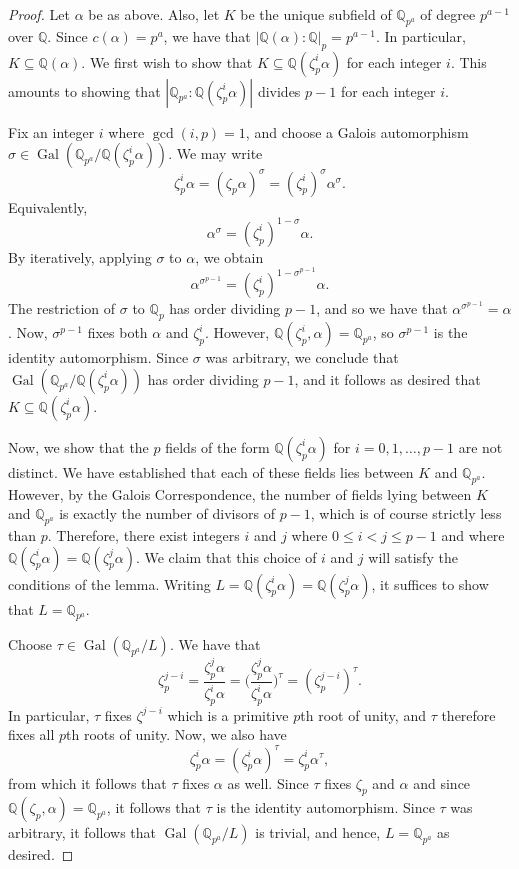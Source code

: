 \documentclass[12pt]{amsart}
\theoremstyle{definition}
\newcommand{\Q}{\mathbb{Q}}
\DeclareMathOperator{\Gal}{Gal}
\begin{document}
\begin{proof}
	Let $\alpha$ be as above. Also, let $K$ be the unique subfield of $\Q_{p^a}$ of degree $p^{a-1}$ over $\Q$. Since $c(\alpha) = p^{a}$, we have that $|\Q(\alpha) : \Q|_p = p^{a-1}$. In particular, $K \subseteq \Q(\alpha)$. We first wish to show that $K \subseteq  \Q(\zeta_p^i\alpha)$ for each integer $i$. This amounts to showing that $|\Q_{p^a} : \Q(\zeta_p^i\alpha)|$ divides $p-1$ for each integer $i$.
	
	Fix an integer $i$ where $\gcd(i,p) = 1$, and choose a Galois automorphism $\sigma \in \Gal(\Q_{p^a}/\Q(\zeta_p^i\alpha))$. We may write
	$$
	\zeta_p^i \alpha = (\zeta_p\alpha)^\sigma = (\zeta_p^i)^\sigma\alpha^\sigma.
	$$
	Equivalently,
	$$
	\alpha^{\sigma} = (\zeta_p^i)^{1-\sigma}\alpha.
	$$
	By iteratively, applying $\sigma$ to $\alpha$, we obtain
	$$
	\alpha^{\sigma^{p-1}} = (\zeta_p^i)^{1-\sigma^{p-1}}\alpha.
	$$
	The restriction of $\sigma$ to $\Q_p$ has order dividing $p-1$, and so we have that $\alpha^{\sigma^{p-1}} = \alpha$. Now, $\sigma^{p-1}$ fixes both $\alpha$ and $\zeta_p^i$. However, $\Q(\zeta_p^i,\alpha) = \Q_{p^a}$, so $\sigma^{p-1}$ is the identity automorphism. Since $\sigma$ was arbitrary, we conclude that $ \Gal(\Q_{p^a}/\Q(\zeta_p^i\alpha))$ has order dividing $p-1$, and it follows as desired that $K \subseteq \Q(\zeta_p^i\alpha)$.
	
	Now, we show that the $p$ fields of the form $\Q(\zeta_p^i\alpha)$ for $i=0,1,\ldots, p-1$ are not distinct. We have established that each of these fields lies between $K$ and $\Q_{p^a}$. However, by the Galois Correspondence, the number of fields lying between $K$ and $\Q_{p^a}$ is exactly the number of divisors of $p-1$, which is of course strictly less than $p$. Therefore, there exist integers $i$ and $j$ where $0 \leq i < j \leq p-1$ and where $\Q(\zeta_p^i\alpha) = \Q(\zeta_p^j\alpha)$. We claim that this choice of $i$ and $j$ will satisfy the conditions of the lemma. Writing $L = \Q(\zeta_p^i\alpha) = \Q(\zeta_p^j\alpha)$, it suffices to show that $L = \Q_{p^a}$.
	
	Choose $\tau \in \Gal(\Q_{p^a}/L)$. We have that 
	$$
	\zeta_p^{j-i} = \dfrac{\zeta_p^j\alpha}{\zeta_p^i\alpha} =  \bigg(\dfrac{\zeta_p^j\alpha}{\zeta_p^i\alpha}\bigg)^\tau = (\zeta_p^{j-i})^\tau. 
	$$
In particular, $\tau$ fixes $\zeta^{j-i}$ which is a primitive $p$th root of unity, and $\tau$ therefore fixes all $p$th roots of unity. Now, we also have
$$
\zeta_p^i\alpha = (\zeta_p^i\alpha)^\tau = \zeta_{p}^i\alpha^\tau,
$$
from which it follows that $\tau$ fixes $\alpha$ as well. Since $\tau$ fixes $\zeta_p$ and $\alpha$ and since $\Q(\zeta_p,\alpha) = \Q_{p^a}$, it follows that $\tau$ is the identity automorphism. Since $\tau$ was arbitrary, it follows that $\Gal(\Q_{p^a}/L)$ is trivial, and hence, $L = \Q_{p^a}$ as desired. 
\end{proof}
\end{document}
